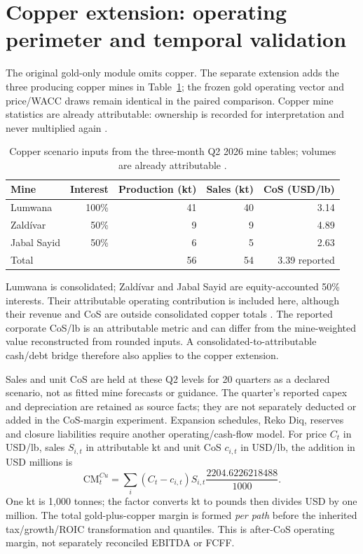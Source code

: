 \clearpage
\section{Copper extension: operating perimeter and temporal validation}
\label{sec:copper-extension}

The original gold-only module omits copper. The separate extension adds the
three producing copper mines in Table~\ref{tab:copper-operating-perimeter};
the frozen gold operating vector and price/WACC draws remain identical in
the paired comparison. Copper mine statistics are already attributable:
ownership is recorded for interpretation and never multiplied again
\cite{barrick-mine-stats-2026}.

\begin{table}[H]
\centering\small
\caption{Copper scenario inputs from the three-month Q2 2026 mine tables;
volumes are already attributable \cite{barrick-mine-stats-2026}.}
\label{tab:copper-operating-perimeter}
\begin{tabularx}{\textwidth}{@{}Xrrrr@{}}
\toprule
Mine & Interest & Production (kt) & Sales (kt) & CoS (USD/lb) \\
\midrule
Lumwana & 100\% & 41 & 40 & 3.14 \\
Zald\'ivar & 50\% & 9 & 9 & 4.89 \\
Jabal Sayid & 50\% & 6 & 5 & 2.63 \\
\midrule
Total & & 56 & 54 & 3.39 reported \\
\bottomrule
\end{tabularx}
\end{table}

Lumwana is consolidated; Zald\'ivar and Jabal Sayid are equity-accounted
50\% interests. Their attributable operating contribution is included here,
although their revenue and CoS are outside consolidated copper totals
\cite{barrick-ar-2025}. The reported corporate CoS/lb is an attributable
metric and can differ from the mine-weighted value reconstructed from rounded
inputs. A consolidated-to-attributable cash/debt bridge therefore also applies
to the copper extension.

Sales and unit CoS are held at these Q2 levels for 20 quarters as a declared
scenario, not as fitted mine forecasts or guidance. The quarter's reported
capex and depreciation are retained as source facts; they are not separately
deducted or added in the CoS-margin experiment. Expansion schedules, Reko Diq,
reserves and closure liabilities require another operating/cash-flow model.
For price $C_t$ in USD/lb, sales $S_{i,t}$ in attributable kt and unit CoS
$c_{i,t}$ in USD/lb, the addition in USD millions is
\begin{equation}
\mathrm{CM}^{Cu}_t=\sum_i(C_t-c_{i,t})S_{i,t}
\frac{2204.6226218488}{1000}.
\label{eq:copper-margin}
\end{equation}
One kt is 1,000 tonnes; the factor converts kt to pounds then divides USD by
one million. The total gold-plus-copper margin is formed \emph{per path}
before the inherited tax/growth/ROIC transformation and quantiles. This is
after-CoS operating margin, not separately reconciled EBITDA or FCFF.

